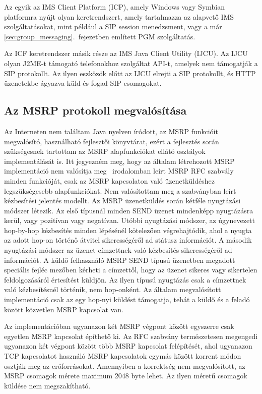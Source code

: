 Az egyik az IMS Client Platform (ICP), amely Windows vagy Symbian platformra nyújt olyan keretrendszert, amely tartalmazza az alapvető IMS szolgáltatásokat, mint például a SIP session menedzsment, vagy a már \ref{sec:group_messaging}.~fejezetben említett PGM szolgáltatás.

Az ICF keretrendszer másik része az IMS Java Client Utility (IJCU). Az IJCU olyan J2ME-t támogató telefonokhoz szolgáltat API-t, amelyek nem támogatják a SIP protokollt. Az ilyen eszközök előtt az IJCU  elrejti a SIP protokollt, és HTTP üzenetekbe ágyazva küld és fogad SIP csomagokat.

\newpage 

\subsection{Az MSRP protokoll megvalósítása}
\label{sec:msrp_implementacio}

Az Interneten nem találtam Java nyelven íródott, az MSRP funkcióit megvalósító, használható fejlesztői könyvtárat, ezért a fejlesztés során szükségesnek tartottam az MSRP alapfunkciókat ellátó osztályok implementálását is. Itt jegyezném meg, hogy az általam létrehozott MSRP implementáció nem valósítja meg ~irodalomban leírt MSRP RFC szabvály minden funkcióját, csak az MSRP kapcsolaton való üzenetküldéshez legszükségesebb alapfunkciókat. Nem valósítottam meg a szabványban leírt kézbesítési jelentés modellt. Az MSRP üzenetküldés során kétféle nyugtázási módszer létezik. Az első típusnál minden SEND üzenet mindenképp nyugtázásra kerül, vagy pozitívan vagy negatívan. Utóbbi nyugtázási módszer, az úgynevezett hop-by-hop kézbesítés minden lépésénél kötelezően végrehajtódik, ahol a nyugta az adott hop-on történő átvitel sikerességéről ad státusz információt. A második nyugtázási módszer az üzenet címzettnek való kézbesítés sikerességéről ad információt. A küldő felhasználó MSRP SEND típusú üzenetben megadott speciális fejléc mezőben kérheti a címzettől, hogy az üzenet sikeres vagy sikertelen feldolgozásáról értesítést küldjön. Az ilyen típusú nyugtázás csak a címzettnek való kézbesítésnél történik, nem hop-onként. Az általam megvalósított implementáció csak az egy hop-nyi küldést támogatja, tehát a küldő és a feladó között közvetlen MSRP kapcsolat van.

Az implementációban ugyanazon két MSRP végpont között egyszerre csak egyetlen MSRP kapcsolat építhető ki. Az RFC szabvány természetesen megengedi ugyanazon két végpont között több MSRP kapcsolat felépítését, ahol ugyanazon TCP kapcsolatot használó MSRP kapcsolatok egymás között korrent módon osztják meg az erőforrásokat. Amennyiben a korrektség nem megvalósított, az MSRP csomagok mérete maximum 2048 byte lehet. Az ilyen méretű csomagok küldése nem megszakítható.

